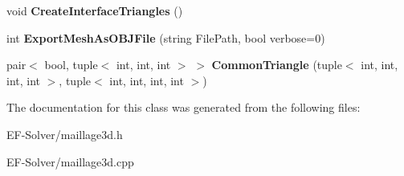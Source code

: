 \begin{DoxyCompactItemize}
\item 
void {\bfseries Create\+Interface\+Triangles} ()\hypertarget{class_maillage3_d_ad9f418d68538572cbac972ed06292ceb}{}\label{class_maillage3_d_ad9f418d68538572cbac972ed06292ceb}

\item 
int {\bfseries Export\+Mesh\+As\+O\+B\+J\+File} (string File\+Path, bool verbose=0)\hypertarget{class_maillage3_d_a83c7b21c6f33946ceb59fade2dbb93b5}{}\label{class_maillage3_d_a83c7b21c6f33946ceb59fade2dbb93b5}

\item 
pair$<$ bool, tuple$<$ int, int, int $>$ $>$ {\bfseries Common\+Triangle} (tuple$<$ int, int, int, int $>$, tuple$<$ int, int, int, int $>$)\hypertarget{class_maillage3_d_ad962a76ff2824457bb8dd0cfd19e0341}{}\label{class_maillage3_d_ad962a76ff2824457bb8dd0cfd19e0341}

\end{DoxyCompactItemize}


The documentation for this class was generated from the following files\+:\begin{DoxyCompactItemize}
\item 
E\+F-\/\+Solver/maillage3d.\+h\item 
E\+F-\/\+Solver/maillage3d.\+cpp\end{DoxyCompactItemize}
